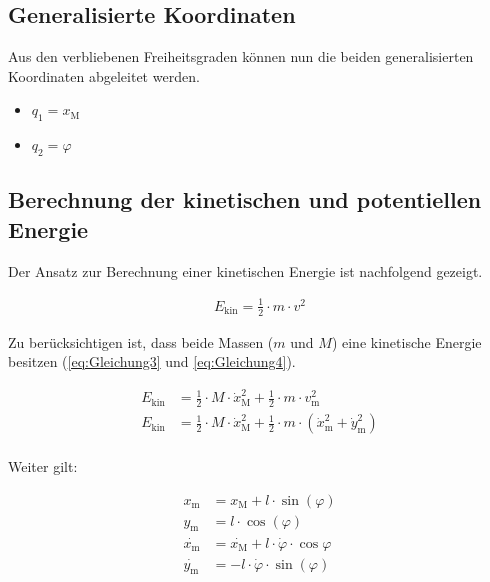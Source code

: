 \documentclass[
	pagesize,
	fontsize=12pt,
	paper=a4,
	oneside,
   reqno
]{scrartcl}
\begin{document}
\subsection{Generalisierte Koordinaten}

Aus den verbliebenen Freiheitsgraden können nun die beiden generalisierten Koordinaten abgeleitet werden.

\begin{itemize}
    \item $q_{\mathrm{1}} = x_{\mathrm{M}}$
    \item $q_{\mathrm{2}} = \varphi$
\end{itemize}

\subsection{Berechnung der kinetischen und potentiellen Energie}

Der Ansatz zur Berechnung einer kinetischen Energie ist nachfolgend gezeigt.

\begin{align}\label{eq:Gleichung2}
    E_{\mathrm{kin}} = \frac{1}{2} \cdot m \cdot v^2
\end{align}

Zu berücksichtigen ist, dass beide Massen ($m$ und $M$) eine kinetische Energie besitzen (\autoref{eq:Gleichung3} und \autoref{eq:Gleichung4}).

\begin{align}
    E_{\mathrm{kin}} &= \frac{1}{2} \cdot M \cdot \dot{x}_{\mathrm{M}}^2 + \frac{1}{2} \cdot m \cdot v_{\mathrm{m}}^2 \label{eq:Gleichung3} \\
    E_{\mathrm{kin}} &= \frac{1}{2} \cdot M \cdot \dot{x}_{\mathrm{M}}^2 + \frac{1}{2} \cdot m \cdot \left(\dot{x}_{\mathrm{m}}^2 + \dot{y}_{\mathrm{m}}^2\right) \label{eq:Gleichung4}
\end{align} \\

Weiter gilt:

\begin{align*}
    x_{\mathrm{m}} &= x_{\mathrm{M}} + l \cdot \sin({\varphi}) \\
    y_{\mathrm{m}} &= l \cdot \cos({\varphi}) \\
    \dot{x_{\mathrm{m}}} &= \dot{x_{\mathrm{M}}} + l \cdot \dot{\varphi} \cdot \cos{\varphi} \\
    \dot{y_{\mathrm{m}}} &= -l \cdot \dot{\varphi} \cdot \sin({\varphi})
\end{align*}
\end{document}
